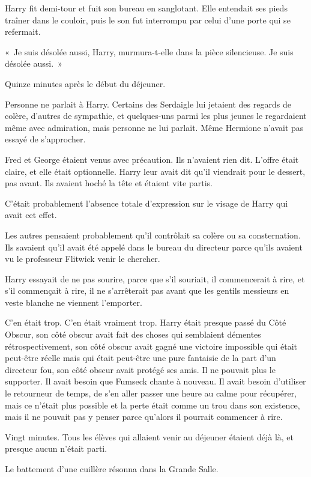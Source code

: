 Harry fit demi-tour et fuit son bureau en sanglotant.
Elle entendait ses pieds traîner dans le couloir, puis le son fut interrompu par celui d'une porte qui se refermait.

«~Je suis désolée aussi, Harry, murmura-t-elle dans la pièce silencieuse.
Je suis désolée aussi.~»

\later

Quinze minutes après le début du déjeuner.

Personne ne parlait à Harry.
Certains des Serdaigle lui jetaient des regards de colère, d'autres de sympathie, et quelques-uns parmi les plus jeunes le regardaient même avec admiration, mais personne ne lui parlait.
Même Hermione n'avait pas essayé de s'approcher.

Fred et George étaient venus avec précaution.
Ils n'avaient rien dit.
L'offre était claire, et elle était optionnelle.
Harry leur avait dit qu'il viendrait pour le dessert, pas avant.
Ils avaient hoché la tête et étaient vite partis.

C'était probablement l'absence totale d'expression sur le visage de Harry qui avait cet effet.

Les autres pensaient probablement qu'il contrôlait sa colère ou sa consternation.
Ils savaient qu'il avait été appelé dans le bureau du directeur parce qu'ils avaient vu le professeur Flitwick venir le chercher.

Harry essayait de ne pas sourire, parce que s'il souriait, il commencerait à rire, et s'il commençait à rire, il ne s'arrêterait pas avant que les gentils messieurs en veste blanche ne viennent l'emporter.

C'en était trop.
C'en était vraiment trop.
Harry était presque passé du Côté Obscur, son côté obscur avait fait des choses qui semblaient démentes rétrospectivement, son côté obscur avait gagné une victoire impossible qui était peut-être réelle mais qui était peut-être une pure fantaisie de la part d'un directeur fou, son côté obscur avait protégé ses amis.
Il ne pouvait plus le supporter.
Il avait besoin que Fumseck chante à nouveau.
Il avait besoin d'utiliser le retourneur de temps, de s'en aller passer une heure au calme pour récupérer, mais ce n'était plus possible et la perte était comme un trou dans son existence, mais il ne pouvait pas y penser parce qu'alors il pourrait commencer à rire.

Vingt minutes.
Tous les élèves qui allaient venir au déjeuner étaient déjà là, et presque aucun n'était parti.

Le battement d'une cuillère résonna dans la Grande Salle.

